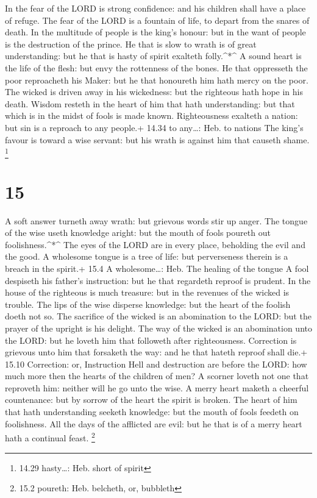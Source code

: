  In the fear of the LORD is strong confidence: and his
children shall have a place of refuge.  The fear of the
LORD is a fountain of life, to depart from the snares of death.
 In the multitude of people is the king's honour: but in
the want of people is the destruction of the prince.  He
that is slow to wrath is of great understanding: but he that is hasty of
spirit exalteth folly.\^{}*\^{}  A sound heart is the life
of the flesh: but envy the rottenness of the bones.  He
that oppresseth the poor reproacheth his Maker: but he that honoureth
him hath mercy on the poor.  The wicked is driven away in
his wickedness: but the righteous hath hope in his death. 
Wisdom resteth in the heart of him that hath understanding: but that
which is in the midst of fools is made known. 
Righteousness exalteth a nation: but sin is a reproach to any people.+
14.34 to any\ldots: Heb. to nations  The king's favour is
toward a wise servant: but his wrath is against him that causeth shame.
\footnote{14.29 hasty\ldots: Heb. short of spirit}

\hypertarget{section-14}{%
\section{15}\label{section-14}}

 A soft answer turneth away wrath: but grievous words stir
up anger.  The tongue of the wise useth knowledge aright:
but the mouth of fools poureth out foolishness.\^{}*\^{} 
The eyes of the LORD are in every place, beholding the evil and the
good.  A wholesome tongue is a tree of life: but
perverseness therein is a breach in the spirit.+ 15.4 A wholesome\ldots:
Heb. The healing of the tongue  A fool despiseth his
father's instruction: but he that regardeth reproof is prudent.
 In the house of the righteous is much treasure: but in the
revenues of the wicked is trouble.  The lips of the wise
disperse knowledge: but the heart of the foolish doeth not so.
 The sacrifice of the wicked is an abomination to the LORD:
but the prayer of the upright is his delight.  The way of
the wicked is an abomination unto the LORD: but he loveth him that
followeth after righteousness.  Correction is grievous unto
him that forsaketh the way: and he that hateth reproof shall die.+ 15.10
Correction: or, Instruction  Hell and destruction are
before the LORD: how much more then the hearts of the children of men?
 A scorner loveth not one that reproveth him: neither will
he go unto the wise.  A merry heart maketh a cheerful
countenance: but by sorrow of the heart the spirit is broken.
 The heart of him that hath understanding seeketh
knowledge: but the mouth of fools feedeth on foolishness. 
All the days of the afflicted are evil: but he that is of a merry heart
hath a continual feast. \footnote{15.2 poureth: Heb. belcheth, or,
  bubbleth}


